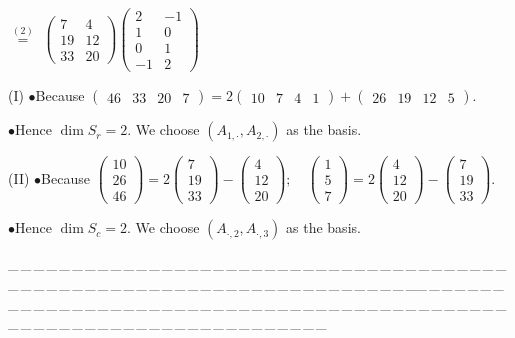 \documentclass[a4paper, 11pt, UTF8]{article}
\def\EndI{\hspace{-3pt}}
\def\HI{\quad\hspace{6.5pt}}
\def\HII{\quad\hspace{7.5pt}}
\def\ProblemEnding{{\tiny \_\,\_\,\_\,\_\,\_\,\_\,\_\,\_\,\_\,\_\,\_\,\_\,\_\,\_\,\_\,\_\,\_\,\_\,\_\,\_\,\_\,\_\,\_\,\_\,\_\,\_\,\_\,\_\,\_\,\_\,\_\,\_\,\_\,\_\,\_\,\_\,\_\,\_\,\_\,\_\,\_\,\_\,\_\,\_\,\_\,\_\,\_\,\_\,\_\,\_\,\_\,\_\,\_\,\_\,\_\,\_\,\_\,\_\,\_\,\_\,\_\,\_\,\_\,\_\,\_\,\_\,\_\,\_\,\_\,\_\,\_\_\,\_\,\_\,\_\,\_\,\_\,\_\,\_\,\_\,\_\,\_\,\_\,\_\,\_\,\_\,\_\,\_\,\_\,\_\,\_\,\_\,\_\,\_\,\_\,\_\,\_\,\_\,\_\,\_\,\_\,\_\,\_\,\_\,\_\,\_\,\_\,\_\,\_\,\_\,\_\,\_\,\_\,\_\,\_\,\_\,\_\,\_\,\_\,\_\,\_\,\_\,\_\,\_\,\_\,\_\,\_\,\_\,\_\,\_\,\_\,\_\,\_\,\_\,\_\,\_\,\_\,\_\,\_\,\_\,\_\,\_}}
\def\dbsp{$\bullet$}
\begin{document}
\begin{large}
{{$\overset{(2)}{=}$}
$\begin{pmatrix} 7 & 4\\ 19 & 12\\ 33 & 20\end{pmatrix}\begin{pmatrix} 2 & -1\\ 1 & 0\\ 0 & 1\\ -1 & 2\end{pmatrix}$}\par\quad
(I) \dbsp Because {\small$\begin{pmatrix} 46 & 33 & 20 & 7 \end{pmatrix}=2\begin{pmatrix} 10 & 7 & 4 & 1\end{pmatrix}+\begin{pmatrix} 26 & 19 & 12 & 5\end{pmatrix}$}.\par\quad\HI
\dbsp Hence $\dim S_r=2$. We choose $(A_{1,\cdot},A_{2,\cdot})$ as the basis.\par\vspace{6pt}\quad\EndI
(II) \dbsp Because {\small$\begin{pmatrix} 10\\ 26\\ 46\end{pmatrix}=2\begin{pmatrix} 7\\ 19\\ 33\end{pmatrix}-\begin{pmatrix} 4\\ 12\\ 20\end{pmatrix}; \quad \begin{pmatrix} 1\\ 5\\ 7\end{pmatrix}=2\begin{pmatrix} 4\\ 12\\ 20\end{pmatrix}-\begin{pmatrix} 7\\ 19\\ 33\end{pmatrix}$}.\par\vspace{6pt}\quad\HII
\dbsp Hence $\dim S_c=2.$ We choose $(A_{\cdot,2},A_{\cdot,3})$ as the basis.\par
\ProblemEnding\par


\end{large}
\end{document}
